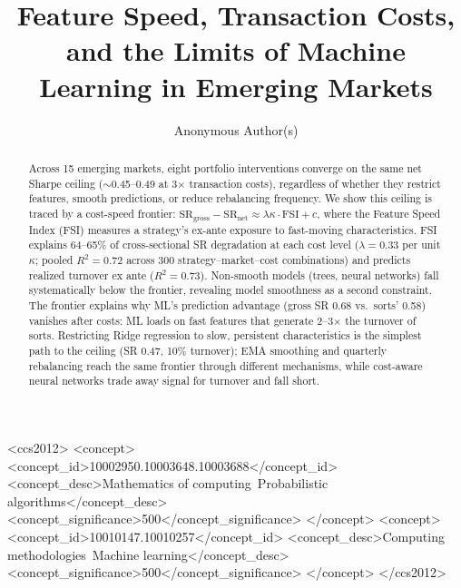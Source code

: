 \documentclass[sigconf,review,anonymous,balance=false]{acmart}
\begin{document}
\title{Feature Speed, Transaction Costs, and the Limits of Machine Learning in Emerging Markets}

\author{Anonymous Author(s)}

\begin{abstract}
Across 15 emerging markets, eight portfolio interventions
converge on the same net Sharpe ceiling (${\sim}$0.45--0.49 at
3$\times$ transaction costs), regardless of whether they restrict
features, smooth predictions, or reduce
rebalancing frequency. We show this ceiling is traced by a
cost-speed frontier: $\text{SR}_{\text{gross}} - \text{SR}_{\text{net}}
\approx \lambda \kappa \cdot \text{FSI} + c$, where the Feature Speed
Index (FSI) measures a strategy's ex-ante exposure to fast-moving
characteristics. FSI explains 64--65\% of cross-sectional SR
degradation at each cost level ($\lambda = 0.33$ per unit $\kappa$;
pooled $R^2 = 0.72$ across 300 strategy--market--cost combinations)
and predicts realized turnover ex ante ($R^2 = 0.73$).
Non-smooth models (trees, neural networks) fall systematically below
the frontier, revealing model smoothness as a second constraint.
The frontier explains why ML's prediction advantage (gross SR 0.68 vs.\
sorts' 0.58) vanishes after costs: ML loads on fast features that
generate 2--3$\times$ the turnover of sorts. Restricting Ridge regression to
slow, persistent characteristics is the simplest path to the ceiling
(SR 0.47, 10\% turnover); EMA smoothing and quarterly rebalancing
reach the same frontier through different mechanisms, while cost-aware
neural networks trade away signal for turnover and fall short.
\end{abstract}

\begin{CCSXML}
<ccs2012>
<concept>
<concept_id>10002950.10003648.10003688</concept_id>
<concept_desc>Mathematics of computing~Probabilistic algorithms</concept_desc>
<concept_significance>500</concept_significance>
</concept>
<concept>
<concept_id>10010147.10010257</concept_id>
<concept_desc>Computing methodologies~Machine learning</concept_desc>
<concept_significance>500</concept_significance>
</concept>
</ccs2012>
\end{CCSXML}

\ccsdesc[500]{Computing methodologies~Machine learning}
\end{document}
